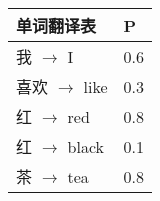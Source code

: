 {\small
\begin{tabular}{l | l}
单词翻译表 & P \\ \hline
我 $\to$ I & 0.6 \\
喜欢 $\to$ like & 0.3 \\
红 $\to$ red & 0.8 \\
红 $\to$ black & 0.1 \\
茶 $\to$ tea & 0.8\\
\end{tabular}
}

